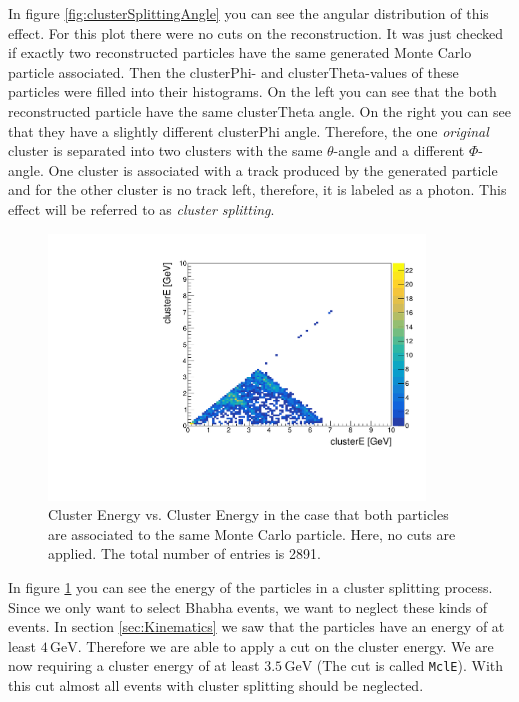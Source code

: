 \documentclass[a4paper,11pt,twosided,final,german,openbib,pdftex,listof=totoc,bibliography=totoc]{scrbook}
\begin{document}
In figure \ref{fig:clusterSplittingAngle} you can see the angular distribution of this effect. For this plot there were no cuts on the reconstruction. It was just checked if exactly two reconstructed particles have the same generated Monte Carlo particle associated. Then the clusterPhi- and clusterTheta-values of these particles were filled into their histograms. On the left you can see that the both reconstructed particle have the same clusterTheta angle. On the right you can see that they have a slightly different clusterPhi angle. Therefore, the one \textit{original} cluster  is separated into two clusters with the same $\theta$-angle and a different $\Phi$-angle. One cluster is associated with a track produced by the generated particle and for the other cluster is no track left, therefore, it is labeled as a photon. This effect will be referred to as \textit{cluster splitting}.





\begin{figure}[h!]
	\centering
	\includegraphics[width=10cm]{AnhangPlots/EEdoubleMCE}
	\caption[Cluster Splitting Energy Distribution]{Cluster Energy vs. Cluster Energy in the case that both particles are associated to the same Monte Carlo particle. Here, no cuts are applied. The total number of entries is 2891.}
	\label{fig:clusterSplittingE}
\end{figure}

In figure \ref{fig:clusterSplittingE} you can see the energy of the particles in a cluster splitting process. Since we only want to select Bhabha events, we want to neglect these kinds of events. In section \ref{sec:Kinematics} we saw that the particles have an energy of at least $4\,\textrm{GeV}$. Therefore we are able to apply a cut on the cluster energy. We are now requiring a cluster energy of at least $3.5\,\textrm{GeV}$ (The cut is called \texttt{MclE}). With this cut almost all events with cluster splitting should be neglected.
\end{document}
